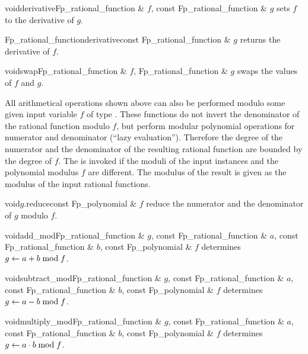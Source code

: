 \begin{fcode}{void}{derivative}{Fp_rational_function & $f$, const Fp_rational_function & $g$}
  sets $f$ to the derivative of $g$.
\end{fcode}

\begin{fcode}{Fp_rational_function}{derivative}{const Fp_rational_function & $g$}
  returns the derivative of $f$.
\end{fcode}

\begin{fcode}{void}{swap}{Fp_rational_function & $f$, Fp_rational_function & $g$}
  swaps the values of $f$ and $g$.
\end{fcode}



All arithmetical operations shown above can also be performed modulo some given input variable
$f$ of type .  These functions do not invert the denominator of the rational
function modulo $f$, but perform modular polynomial operations for numerator and denominator
(``lazy evaluation'').  Therefore the degree of the numerator and the denominator of the
resulting rational function are bounded by the degree of $f$.  The \LEH is invoked if the moduli
of the input instances and the polynomial modulus $f$ are different.  The modulus of the result
is given as the modulus of the input rational functions.

\begin{fcode}{void}{$g$.reduce}{const Fp_polynomial & $f$}
  reduce the numerator and the denominator of $g$ modulo $f$.
\end{fcode}

\begin{fcode}{void}{add_mod}{Fp_rational_function & $g$, const Fp_rational_function & $a$,
    const Fp_rational_function & $b$, const Fp_polynomial & $f$}%
  determines $g \leftarrow a + b \bmod f$.
\end{fcode}

\begin{fcode}{void}{subtract_mod}{Fp_rational_function & $g$, const Fp_rational_function & $a$,
    const Fp_rational_function & $b$, const Fp_polynomial & $f$}%
  determines $g \leftarrow a - b \bmod f$.
\end{fcode}

\begin{fcode}{void}{multiply_mod}{Fp_rational_function & $g$, const Fp_rational_function & $a$,
    const Fp_rational_function & $b$, const Fp_polynomial & $f$}%
  determines $g \leftarrow a \cdot b \bmod f$.
\end{fcode}


